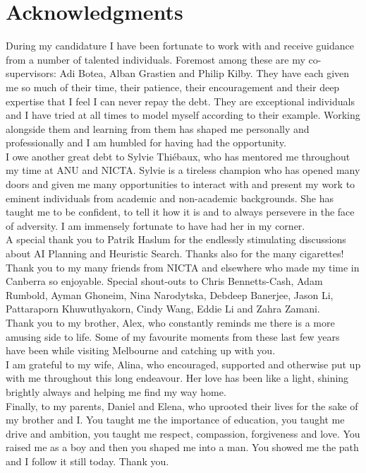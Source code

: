 \chapter*{Acknowledgments}

During my candidature I have been fortunate to work with and receive
guidance from a number of talented individuals. 
Foremost among these are my co-supervisors: Adi Botea, 
Alban Grastien and Philip Kilby. They have each given me so much of their time, 
their patience, their encouragement and their deep expertise that 
I feel I can never repay the debt. They are exceptional individuals and
I have tried at all times to model myself according to their example.  
Working alongside them and learning from them has shaped me personally and
professionally and I am humbled for having had the opportunity.
\newline \\ 
\noindent 
I owe another great debt to Sylvie Thi{\'e}baux, who has mentored me
throughout my time at ANU and NICTA.  Sylvie is a tireless champion who has opened
many doors and given me many opportunities to interact with and present my
work to eminent individuals from academic and non-academic backgrounds. She
has taught me to be confident, to tell it how it is and to always persevere in
the face of adversity. I am immensely fortunate to have had her in my corner.
\newline \\ 
\noindent
A special thank you to Patrik Haslum for the endlessly stimulating discussions
about AI Planning and Heuristic Search.  Thanks also for the many cigarettes!
\newline \\ 
\noindent
Thank you to my many friends from NICTA and elsewhere who made my time in
Canberra so enjoyable. Special shout-outs to Chris Bennetts-Cash, Adam
Rumbold, Ayman Ghoneim, Nina Narodytska, Debdeep Banerjee, Jason Li,
Pattaraporn Khuwuthyakorn, Cindy Wang, Eddie Li and Zahra Zamani.
\newline \\ 
\noindent
Thank you to my brother, Alex, who constantly reminds me there is a more
amusing side to life. Some of my favourite moments from these last few years have
been while visiting Melbourne and catching up with you.
\newline \\ 
\noindent
I am grateful to my wife, Alina, who encouraged, supported and
otherwise put up with me throughout this long endeavour. Her love has been
like a light, shining brightly always and helping me find my way home.
\newline \\ 
\noindent
Finally, to my parents, Daniel and Elena, who uprooted their lives for the sake
of my brother and I.  You taught me the importance of education, you taught me
drive and ambition, you taught me respect, compassion, forgiveness and love.
You raised me as a boy and then you shaped me into a man. You showed me the
path and I follow it still today. Thank you.

